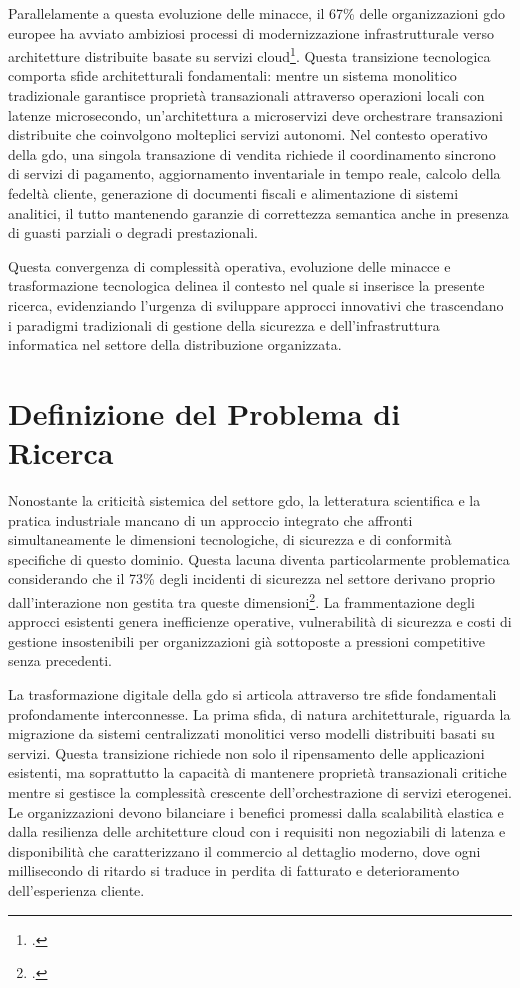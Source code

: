Parallelamente a questa evoluzione delle minacce, il 67\% delle organizzazioni \gls{gdo} europee ha avviato ambiziosi processi di modernizzazione infrastrutturale verso architetture distribuite basate su servizi cloud\footcite{Gartner2024cloud}. Questa transizione tecnologica comporta sfide architetturali fondamentali: mentre un sistema monolitico tradizionale garantisce proprietà transazionali attraverso operazioni locali con latenze microsecondo, un'architettura a microservizi deve orchestrare transazioni distribuite che coinvolgono molteplici servizi autonomi. Nel contesto operativo della \gls{gdo}, una singola transazione di vendita richiede il coordinamento sincrono di servizi di pagamento, aggiornamento inventariale in tempo reale, calcolo della fedeltà cliente, generazione di documenti fiscali e alimentazione di sistemi analitici, il tutto mantenendo garanzie di correttezza semantica anche in presenza di guasti parziali o degradi prestazionali.

Questa convergenza di complessità operativa, evoluzione delle minacce e trasformazione tecnologica delinea il contesto nel quale si inserisce la presente ricerca, evidenziando l'urgenza di sviluppare approcci innovativi che trascendano i paradigmi tradizionali di gestione della sicurezza e dell'infrastruttura informatica nel settore della distribuzione organizzata.

\section{\texorpdfstring{Definizione del Problema di Ricerca}{1.2 - Definizione del Problema di Ricerca}}
\label{sec:problema_ricerca}

Nonostante la criticità sistemica del settore \gls{gdo}, la letteratura scientifica e la pratica industriale mancano di un approccio integrato che affronti simultaneamente le dimensioni tecnologiche, di sicurezza e di conformità specifiche di questo dominio. Questa lacuna diventa particolarmente problematica considerando che il 73\% degli incidenti di sicurezza nel settore derivano proprio dall'interazione non gestita tra queste dimensioni\footcite{ponemon2024retail}. La frammentazione degli approcci esistenti genera inefficienze operative, vulnerabilità di sicurezza e costi di gestione insostenibili per organizzazioni già sottoposte a pressioni competitive senza precedenti.

La trasformazione digitale della \gls{gdo} si articola attraverso tre sfide fondamentali profondamente interconnesse. La prima sfida, di natura architetturale, riguarda la migrazione da sistemi centralizzati monolitici verso modelli distribuiti basati su servizi. Questa transizione richiede non solo il ripensamento delle applicazioni esistenti, ma soprattutto la capacità di mantenere proprietà transazionali critiche mentre si gestisce la complessità crescente dell'orchestrazione di servizi eterogenei. Le organizzazioni devono bilanciare i benefici promessi dalla scalabilità elastica e dalla resilienza delle architetture cloud con i requisiti non negoziabili di latenza e disponibilità che caratterizzano il commercio al dettaglio moderno, dove ogni millisecondo di ritardo si traduce in perdita di fatturato e deterioramento dell'esperienza cliente.

